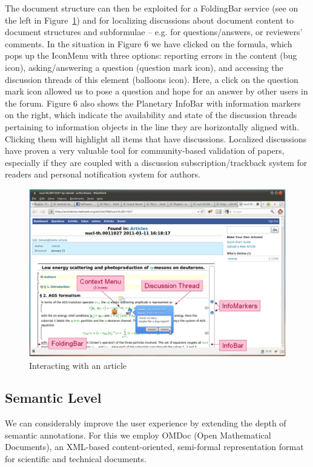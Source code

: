 The document structure can then be exploited for a FoldingBar service (see on the left in
Figure~\ref{fig:interacting-article}) and for localizing discussions about document
content to document structures and subformulae – e.g. for questions/answers, or reviewers'
comments. In the situation in Figure 6 we have clicked on the formula, which pops up the
IconMenu with three options: reporting errors in the content (bug icon), asking/answering
a question (question mark icon), and accessing the discussion threads of this element
(balloons icon). Here, a click on the question mark icon allowed us to pose a question and
hope for an answer by other users in the forum. Figure 6 also shows the Planetary InfoBar
with information markers on the right, which indicate the availability and state of the
discussion threads pertaining to information objects in the line they are horizontally
aligned with. Clicking them will highlight all items that have discussions. Localized
discussions have proven a very valuable tool for community-based validation of papers,
especially if they are coupled with a discussion subscription/trackback system for readers
and personal notification system for authors.

\begin{figure}[ht]\centering
    \includegraphics[width=\textwidth]{PresentationStructure}
    \caption{Interacting with an article}\label{fig:interacting-article}
\end{figure} 

\subsection{Semantic Level}

We can considerably improve the user experience by extending the depth of semantic
annotations. For this we employ OMDoc (Open Mathematical Documents), an XML-based
content-oriented, semi-formal representation format for scientific and technical documents.


